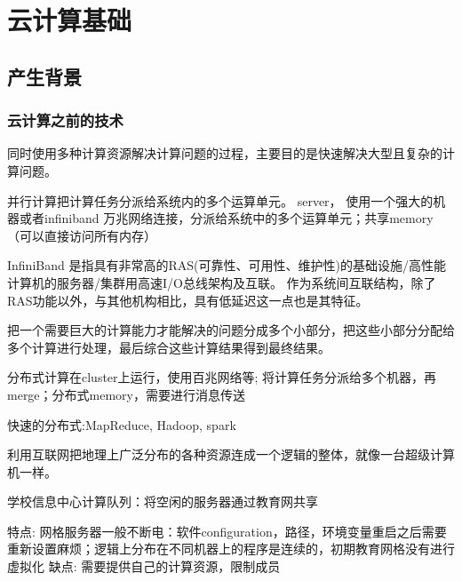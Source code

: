 \chapter{云计算基础}

\section{产生背景}

\subsection{云计算之前的技术}

\begin{definition}[并行计算]
    同时使用多种计算资源解决计算问题的过程，主要目的是快速解决大型且复杂的计算问题。 

\end{definition}

并行计算把计算任务分派给系统内的多个运算单元。  server， 使用一个强大的机器或者infiniband 万兆网络连接，分派给系统中的多个运算单元；共享memory（可以直接访问所有内存）

\begin{definition}[InfiniBand]
    InfiniBand 是指具有非常高的RAS(可靠性、可用性、维护性)的基础设施/高性能计算机的服务器/集群用高速I/O总线架构及互联。 作为系统间互联结构，除了RAS功能以外，与其他机构相比，具有低延迟这一点也是其特征。 
\end{definition}

\begin{definition}[分布式计算]
    把一个需要巨大的计算能力才能解决的问题分成多个小部分，把这些小部分分配给多个计算进行处理，最后综合这些计算结果得到最终结果。 
\end{definition}

分布式计算在cluster上运行，使用百兆网络等; 将计算任务分派给多个机器，再merge；分布式memory，需要进行消息传送

快速的分布式:MapReduce, Hadoop, spark

\begin{definition}[网格计算]
    利用互联网把地理上广泛分布的各种资源连成一个逻辑的整体，就像一台超级计算机一样。 
\end{definition}

\begin{example}[教育网格]
    学校信息中心计算队列：将空闲的服务器通过教育网共享

    特点: 网格服务器一般不断电：软件configuration，路径，环境变量重启之后需要重新设置麻烦；逻辑上分布在不同机器上的程序是连续的，初期教育网格没有进行虚拟化
    缺点: 需要提供自己的计算资源，限制成员
\end{example}

